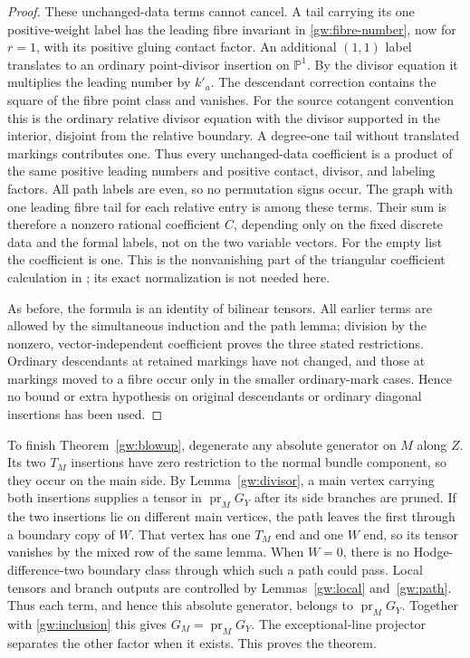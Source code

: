 \begin{proof}
These unchanged-data terms cannot cancel.  A tail carrying its one
positive-weight label has the leading fibre invariant in
\eqref{gw:fibre-number}, now for $r=1$, with its positive gluing contact
factor.  An additional $(1,1)$ label translates to an ordinary point-divisor
insertion on $\mathbb P^1$.  By the divisor equation it multiplies the
leading number by $k'_a$.  The descendant correction contains the square
of the fibre point class and vanishes.  For the source cotangent convention
this is the ordinary relative divisor equation with the divisor supported
in the interior, disjoint from the relative boundary.  A degree-one tail
without translated markings contributes one.  Thus every unchanged-data
coefficient is a product of the same positive leading numbers and positive
contact, divisor, and labeling factors.  All path labels are even, so no
permutation signs occur.  The graph with one leading fibre tail for each
relative entry is among these terms.  Their sum is therefore a nonzero
rational coefficient $C$, depending only on the fixed discrete data and
the formal labels, not on the two variable vectors.  For the empty list
the coefficient is one.  This is the nonvanishing part of the triangular
coefficient calculation in \cite[Section~2.4, Lemma~4]{MP06}; its exact
normalization is not needed here.

As before, the formula is an identity of bilinear tensors.  All earlier
terms are allowed by the simultaneous induction and the path lemma; division
by the nonzero, vector-independent coefficient proves the three stated
restrictions.  Ordinary descendants at retained markings have not changed,
and those at markings moved to a fibre occur only in the smaller ordinary-mark
cases.  Hence no bound or extra hypothesis on original descendants or
ordinary diagonal insertions has been used.
\end{proof}

To finish Theorem~\ref{gw:blowup}, degenerate any absolute generator on $M$
along $Z$.  Its two $T_M$ insertions have zero restriction to the normal
bundle component, so they occur on the main side.  By
Lemma~\ref{gw:divisor}, a main vertex carrying both insertions supplies
a tensor in $\operatorname{pr}_M G_Y$ after its side branches are pruned.
If the two insertions lie on different main vertices, the path leaves
the first through a boundary copy of $W$.  That vertex has one $T_M$ end
and one $W$ end, so its tensor vanishes by the mixed row of the same lemma.
When $W=0$, there is no Hodge-difference-two boundary class through which
such a path could pass.  Local tensors and branch outputs are controlled
by Lemmas~\ref{gw:local} and~\ref{gw:path}.  Thus each term, and hence
this absolute generator, belongs to
$\operatorname{pr}_M G_Y$.  Together with \eqref{gw:inclusion} this gives
$G_M=\operatorname{pr}_M G_Y$.  The exceptional-line projector separates
the other factor when it exists.  This proves the theorem.


